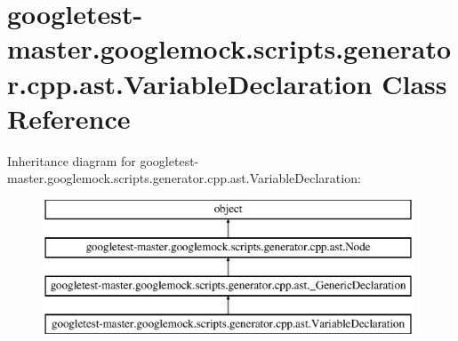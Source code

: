 \hypertarget{classgoogletest-master_1_1googlemock_1_1scripts_1_1generator_1_1cpp_1_1ast_1_1_variable_declaration}{}\section{googletest-\/master.googlemock.\+scripts.\+generator.\+cpp.\+ast.\+Variable\+Declaration Class Reference}
\label{classgoogletest-master_1_1googlemock_1_1scripts_1_1generator_1_1cpp_1_1ast_1_1_variable_declaration}
Inheritance diagram for googletest-\/master.googlemock.\+scripts.\+generator.\+cpp.\+ast.\+Variable\+Declaration\+:\begin{figure}[H]
\begin{center}
\leavevmode
\includegraphics[height=4.000000cm]{dc/d37/classgoogletest-master_1_1googlemock_1_1scripts_1_1generator_1_1cpp_1_1ast_1_1_variable_declaration}
\end{center}
\end{figure}
